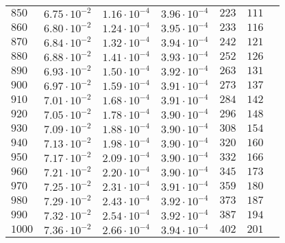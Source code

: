 \begin{table}
\begin{tabular}{lcccccc}
$850 $&$ 6.75\cdot 10^{-2} $&$ 1.16\cdot 10^{-4} $&$ 3.96\cdot 10^{-4} $&$ 223 $&$ 111   $\\
$860 $&$ 6.80\cdot 10^{-2} $&$ 1.24\cdot 10^{-4} $&$ 3.95\cdot 10^{-4} $&$ 233 $&$ 116   $\\
$870 $&$ 6.84\cdot 10^{-2} $&$ 1.32\cdot 10^{-4} $&$ 3.94\cdot 10^{-4} $&$ 242 $&$ 121   $\\
$880 $&$ 6.88\cdot 10^{-2} $&$ 1.41\cdot 10^{-4} $&$ 3.93\cdot 10^{-4} $&$ 252 $&$ 126   $\\
$890 $&$ 6.93\cdot 10^{-2} $&$ 1.50\cdot 10^{-4} $&$ 3.92\cdot 10^{-4} $&$ 263 $&$ 131   $\\
$900 $&$ 6.97\cdot 10^{-2} $&$ 1.59\cdot 10^{-4} $&$ 3.91\cdot 10^{-4} $&$ 273 $&$ 137   $\\
$910 $&$ 7.01\cdot 10^{-2} $&$ 1.68\cdot 10^{-4} $&$ 3.91\cdot 10^{-4} $&$ 284 $&$ 142   $\\
$920 $&$ 7.05\cdot 10^{-2} $&$ 1.78\cdot 10^{-4} $&$ 3.90\cdot 10^{-4} $&$ 296 $&$ 148   $\\
$930 $&$ 7.09\cdot 10^{-2} $&$ 1.88\cdot 10^{-4} $&$ 3.90\cdot 10^{-4} $&$ 308 $&$ 154   $\\
$940 $&$ 7.13\cdot 10^{-2} $&$ 1.98\cdot 10^{-4} $&$ 3.90\cdot 10^{-4} $&$ 320 $&$ 160   $\\
$950 $&$ 7.17\cdot 10^{-2} $&$ 2.09\cdot 10^{-4} $&$ 3.90\cdot 10^{-4} $&$ 332 $&$ 166   $\\
$960 $&$ 7.21\cdot 10^{-2} $&$ 2.20\cdot 10^{-4} $&$ 3.90\cdot 10^{-4} $&$ 345 $&$ 173   $\\
$970 $&$ 7.25\cdot 10^{-2} $&$ 2.31\cdot 10^{-4} $&$ 3.91\cdot 10^{-4} $&$ 359 $&$ 180   $\\
$980 $&$ 7.29\cdot 10^{-2} $&$ 2.43\cdot 10^{-4} $&$ 3.92\cdot 10^{-4} $&$ 373 $&$ 187   $\\
$990 $&$ 7.32\cdot 10^{-2} $&$ 2.54\cdot 10^{-4} $&$ 3.92\cdot 10^{-4} $&$ 387 $&$ 194   $\\
$1000$&$ 7.36\cdot 10^{-2} $&$ 2.66\cdot 10^{-4} $&$ 3.94\cdot 10^{-4} $&$ 402 $&$ 201   $\\
\hline
  \end{tabular}
\end{table}



